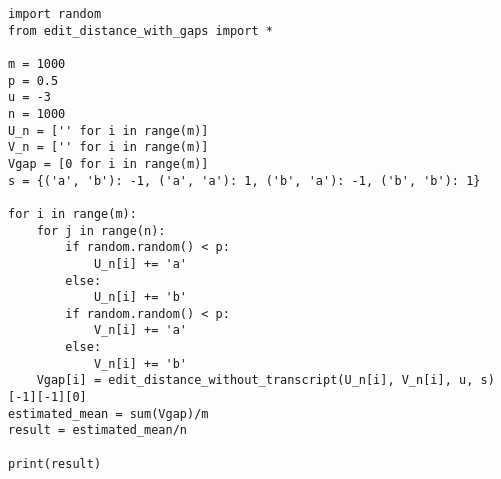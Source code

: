 \lstset{basicstyle=\footnotesize,style=myCustomMatlabStyle}
\begin{lstlisting}
import random
from edit_distance_with_gaps import *

m = 1000
p = 0.5
u = -3
n = 1000
U_n = ['' for i in range(m)]
V_n = ['' for i in range(m)]
Vgap = [0 for i in range(m)]
s = {('a', 'b'): -1, ('a', 'a'): 1, ('b', 'a'): -1, ('b', 'b'): 1}

for i in range(m):
    for j in range(n):
        if random.random() < p:
            U_n[i] += 'a'
        else:
            U_n[i] += 'b'
        if random.random() < p:
            V_n[i] += 'a'
        else:
            V_n[i] += 'b'
    Vgap[i] = edit_distance_without_transcript(U_n[i], V_n[i], u, s)[-1][-1][0]
estimated_mean = sum(Vgap)/m
result = estimated_mean/n

print(result)

\end{lstlisting}